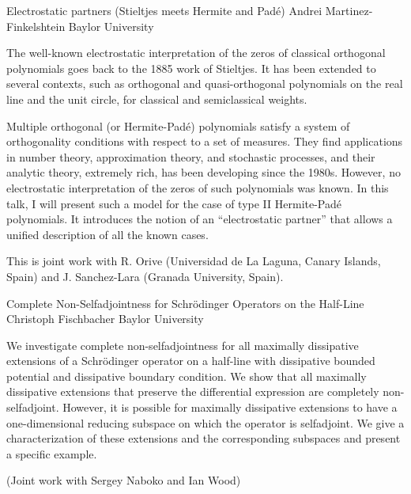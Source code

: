 \vspace{1.5ex}
\abs
{Electrostatic partners (Stieltjes meets Hermite and Padé)}
{Andrei Martinez-Finkelshtein}
{Baylor University}
{
	The well-known electrostatic interpretation of the zeros of classical orthogonal polynomials goes back to the 1885 work of Stieltjes. It has been extended to several contexts, such as orthogonal and quasi-orthogonal polynomials on the real line and the unit circle, for classical and semiclassical weights. 
	
	Multiple orthogonal (or Hermite-Padé) polynomials satisfy a system of orthogonality conditions with respect to a set of measures. They find applications in number theory, approximation theory, and stochastic processes, and their analytic theory, extremely rich, has been developing since the 1980s. However, no electrostatic interpretation of the zeros of such polynomials was known. In this talk, I will present such a model for the case of type II Hermite-Padé polynomials. It introduces the notion of an “electrostatic partner” that allows a unified description of all the known cases. 
	
	This is joint work with R. Orive (Universidad de La Laguna, Canary Islands, Spain) and J. Sanchez-Lara (Granada University, Spain).}


\vspace{1.5ex}
\abs
{Complete Non-Selfadjointness for Schr\"odinger Operators on the Half-Line}
{Christoph Fischbacher}
{Baylor University}
{We investigate complete non-selfadjointness for all maximally dissipative extensions of a Schr\"odinger operator on a half-line with dissipative bounded potential and dissipative boundary condition. We show that all maximally dissipative extensions that preserve the differential expression are completely non-selfadjoint. However, it is possible for maximally dissipative extensions to have a one-dimensional reducing subspace on which the operator is selfadjoint. We give a characterization of these extensions and the corresponding subspaces and present a specific example.

(Joint work with Sergey Naboko and Ian Wood)}
